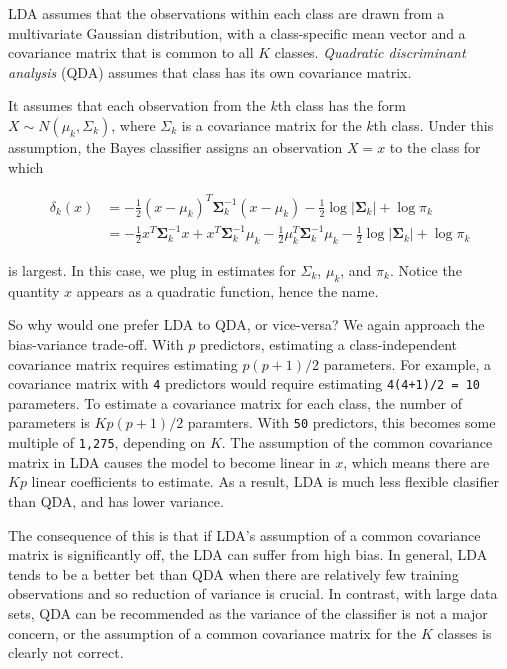 \documentclass[
]{article}
\begin{document}
LDA assumes that the observations within each class are drawn from a
multivariate Gaussian distribution, with a class-specific mean vector
and a covariance matrix that is common to all \(K\) classes.
\emph{Quadratic discriminant analysis} (QDA) assumes that class has its
own covariance matrix.

It assumes that each observation from the \(k\)th class has the form
\(X \sim N(\mu_k, \Sigma_k)\), where \(\Sigma_k\) is a covariance matrix
for the \(k\)th class. Under this assumption, the Bayes classifier
assigns an observation \(X=x\) to the class for which

\[
\begin{aligned} \delta_{k}(x) &=-\frac{1}{2}\left(x-\mu_{k}\right)^{T} \boldsymbol{\Sigma}_{k}^{-1}\left(x-\mu_{k}\right)-\frac{1}{2} \log \left|\boldsymbol{\Sigma}_{k}\right|+\log \pi_{k} \\ &=-\frac{1}{2} x^{T} \boldsymbol{\Sigma}_{k}^{-1} x+x^{T} \boldsymbol{\Sigma}_{k}^{-1} \mu_{k}-\frac{1}{2} \mu_{k}^{T} \boldsymbol{\Sigma}_{k}^{-1} \mu_{k}-\frac{1}{2} \log \left|\boldsymbol{\Sigma}_{k}\right|+\log \pi_{k} \end{aligned}
\]

is largest. In this case, we plug in estimates for \(\Sigma_k\),
\(\mu_k\), and \(\pi_k\). Notice the quantity \(x\) appears as a
quadratic function, hence the name.

So why would one prefer LDA to QDA, or vice-versa? We again approach the
bias-variance trade-off. With \(p\) predictors, estimating a
class-independent covariance matrix requires estimating \(p(p+1)/2\)
parameters. For example, a covariance matrix with \texttt{4} predictors
would require estimating \texttt{4(4+1)/2\ =\ 10} parameters. To
estimate a covariance matrix for each class, the number of parameters is
\(Kp(p+1)/2\) paramters. With \texttt{50} predictors, this becomes some
multiple of \texttt{1,275}, depending on \(K\). The assumption of the
common covariance matrix in LDA causes the model to become linear in
\(x\), which means there are \(Kp\) linear coefficients to estimate. As
a result, LDA is much less flexible clasifier than QDA, and has lower
variance.

The consequence of this is that if LDA's assumption of a common
covariance matrix is significantly off, the LDA can suffer from high
bias. In general, LDA tends to be a better bet than QDA when there are
relatively few training observations and so reduction of variance is
crucial. In contrast, with large data sets, QDA can be recommended as
the variance of the classifier is not a major concern, or the assumption
of a common covariance matrix for the \(K\) classes is clearly not
correct.
\end{document}
